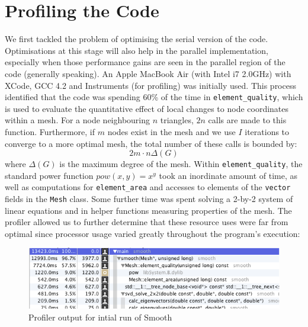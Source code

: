 \documentclass[a4paper,11pt, twocolumn]{article}
\newenvironment{changemargin}[2]{\begin{list}{}{%
\setlength{\topsep}{0pt}%
\setlength{\leftmargin}{0pt}%
\setlength{\rightmargin}{0pt}%
\setlength{\listparindent}{\parindent}%
\setlength{\itemindent}{\parindent}%
\setlength{\parsep}{0pt plus 1pt}%
\addtolength{\leftmargin}{#1}%
\addtolength{\rightmargin}{#2}%
}\item }{\end{list}}
\begin{document}
\section{Profiling the Code}
We first tackled the problem of optimising the serial version of the code.
Optimisations at this stage will also help in the parallel implementation, especially when those performance gains are seen in the parallel region of the code (generally speaking).
An Apple MacBook Air (with Intel i7 2.0GHz) with XCode, GCC 4.2 and Instruments (for profiling) was initially used.
This process identified that the code was spending 60\% of the time in \verb+element_quality+, which is used to evaluate the quantitative effect of local changes to node coordinates within a mesh.
For a node neighbouring $n$ triangles, $2n$ calls are made to this function.
Furthermore, if $m$ nodes exist in the mesh and we use $I$ iterations to converge to a more optimal mesh, the total number of these calls is bounded by:
$$
2m\cdot n\Delta(G)
$$
where $\Delta(G)$ is the maximum degree of the mesh.
Within \verb+element_quality+, the standard power function $pow(x, y) = x^y$ took an inordinate amount of time, as well as computations for \verb+element_area+ and accesses to elements of the \verb+vector+ fields in the \verb+Mesh+ class.
Some further time was spent solving a 2-by-2 system of linear equations and in helper functions measuring properties of the mesh.
The profiler allowed us to further determine that these resource uses were far from optimal since processor usage varied greatly throughout the program's execution:
\begin{figure}[!h]
\begin{changemargin}{-20mm}{-20mm}
\center
\includegraphics[scale=0.4]{profile.png}
\caption{Profiler output for intial run of Smooth}
\end{changemargin}
\end{figure}
\end{document}
